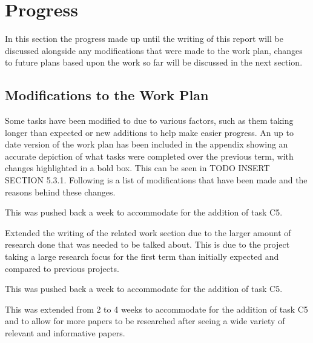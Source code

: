 \documentclass[a4paper]{article}
\begin{document}
\section{Progress}
In this section the progress made up until the writing of this report will be discussed alongside any modifications that were made to the work plan, changes to future plans based upon the work so far will be discussed in the next section.
\subsection{Modifications to the Work Plan}
Some tasks have been modified to due to various factors, such as them taking longer than expected or new additions to help make easier progress.
An up to date version of the work plan has been included in the appendix showing an accurate depiction of what tasks were completed over the previous term, with changes highlighted in a bold box.
This can be seen in TODO INSERT SECTION 5.3.1.
Following is a list of modifications that have been made and the reasons behind these changes.
\begin{description}
\setlength{\itemsep}{0pt}
\setlength{\parskip}{0pt}
\item [\large{Documentation}]
\item [D4--Interim Report Outline Sections]
This was pushed back a week to accommodate for the addition of task C5.
\item [D5--Interim Report Related Work]
Extended the writing of the related work section due to the larger amount of research done that was needed to be talked about.
This is due to the project taking a large research focus for the first term than initially expected and compared to previous projects.
\item [D6--Interim Report Draft]
This was pushed back a week to accommodate for the addition of task C5.
\end{description}

\begin{description}
\setlength{\itemsep}{0pt}
\setlength{\parskip}{0pt}
\item [\large{Research}]
\item [R5--Other Related Works]
This was extended from 2 to 4 weeks to accommodate for the addition of task C5 and to allow for more papers to be researched after seeing a wide variety of relevant and informative papers.
\end{description}
\end{document}
